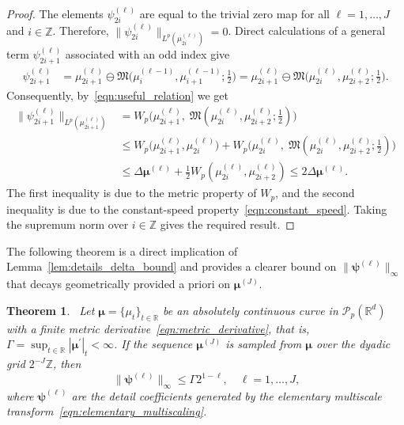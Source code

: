 \documentclass[12pt]{amsart}
\newtheorem{theorem}{Theorem}[section]
\begin{document}
\begin{proof}
    The elements $\psi^{(\ell)}_{2i}$ are equal to the trivial zero map for all $\ell=1,\dots,J$ and $i\in\mathbb{Z}$. Therefore, $\|\psi^{(\ell)}_{2i}\|_{L^p(\mu^{(\ell)}_{2i})}=0$. Direct calculations of a general term $\psi^{(\ell)}_{2i+1}$ associated with an odd index give
    \begin{align*}
        \psi^{(\ell)}_{2i+1} & = \mu^{(\ell)}_{2i+1} \ominus \mathfrak{M}\big(\mu^{(\ell-1)}_{i}, \mu^{(\ell-1)}_{i+1}; \frac{1}{2}\big) = \mu^{(\ell)}_{2i+1} \ominus \mathfrak{M}\big(\mu^{(\ell)}_{2i}, \mu^{(\ell)}_{2i+2}; \frac{1}{2}\big).
    \end{align*}
    Consequently, by~\eqref{eqn:useful_relation} we get
    \begin{align*}
        \|\psi^{(\ell)}_{2i+1}\|_{L^p(\mu^{(\ell)}_{2i+1})} & = W_p\big(\mu^{(\ell)}_{2i+1},\; \mathfrak{M}(\mu^{(\ell)}_{2i}, \mu^{(\ell)}_{2i+2}; \frac{1}{2})\big) \\
        & \leq W_p\big(\mu^{(\ell)}_{2i+1}, \mu^{(\ell)}_{2i}\big) + W_p\big(\mu^{(\ell)}_{2i},\;\mathfrak{M}(\mu^{(\ell)}_{2i}, \mu^{(\ell)}_{2i+2}; \frac{1}{2})\big) \\
        & \leq \Delta \boldsymbol{\mu}^{(\ell)} + \frac{1}{2} W_p(\mu^{(\ell)}_{2i}, \mu^{(\ell)}_{2i+2}) \leq 2 \Delta \boldsymbol{\mu}^{(\ell)}.
    \end{align*}
    The first inequality is due to the metric property of $W_p$, and the second inequality is due to the constant-speed property~\eqref{eqn:constant_speed}. Taking the supremum norm over $i\in\mathbb{Z}$ gives the required result.
\end{proof}

The following theorem is a direct implication of Lemma~\ref{lem:details_delta_bound} and provides a clearer bound on $\|\boldsymbol{\psi}^{(\ell)}\|_{\infty}$ that decays geometrically provided a priori on $\boldsymbol{\mu}^{(J)}$.

\begin{theorem}~\label{thm:details_decay}
    Let $\boldsymbol{\mu}=\{\mu_t\}_{t\in\mathbb{R}}$ be an absolutely continuous curve in $\mathcal{P}_p(\mathbb{R}^d)$ with a finite metric derivative~\eqref{eqn:metric_derivative}, that is, $\Gamma = \sup_{t\in\mathbb{R}}|\boldsymbol{\mu}^\prime|_t<\infty$. If the sequence $\boldsymbol{\mu}^{(J)}$ is sampled from $\boldsymbol{\mu}$ over the dyadic grid $2^{-J}\mathbb{Z}$, then
    \begin{equation}~\label{eqn:details_decay}
        \|\boldsymbol{\psi}^{(\ell)}\|_{\infty} \leq \Gamma 2^{1-\ell}, \quad \ell=1,\dots,J,
    \end{equation}
    where $\boldsymbol{\psi}^{(\ell)}$ are the detail coefficients generated by the elementary multiscale transform~\eqref{eqn:elementary_multiscaling}.
\end{theorem}
\end{document}
